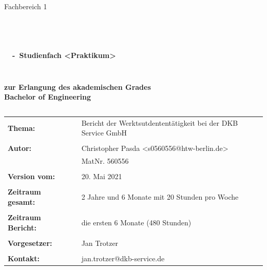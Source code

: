 \begin{center}
\Large{Fachbereich 1}
\end{center}
\begin{verbatim}

\end{verbatim}
\begin{center}
\doublespacing
\textbf{\LARGE{\titleDocument}}\\
\singlespacing
\begin{verbatim}

\end{verbatim}
\textbf{{~\subjectDocument~-~Studienfach <Praktikum>}}
\end{center}
\begin{verbatim}

\end{verbatim}
\begin{center}

\end{center}
\begin{verbatim}

\end{verbatim}
\begin{center}
\textbf{zur Erlangung des akademischen Grades \\ Bachelor of Engineering}
\end{center}
\begin{verbatim}

\end{verbatim}
\begin{flushleft}
\begin{tabular}{llll}
\textbf{Thema:} & & Bericht der Werktsutdententätigkeit bei der DKB Service GmbH & \\
& & \\
\textbf{Autor:} & & Christopher Pasda <s0560556@htw-berlin.de>& \\
& & MatNr. 560556 & \\
& & \\
\textbf{Version vom:} & & 20. Mai 2021&\\
& & \\
\textbf{Zeitraum gesamt:} & & 2 Jahre und 6 Monate mit 20 Stunden pro Woche&\\
& & \\
\textbf{Zeitraum Bericht: } & & die ersten 6 Monate (480 Stunden)&\\
& & \\
\textbf{Vorgesetzer:} & & Jan Trotzer &\\
& & \\
\textbf{Kontakt:} & & jan.trotzer@dkb-service.de &\\

\end{tabular}
\end{flushleft}
